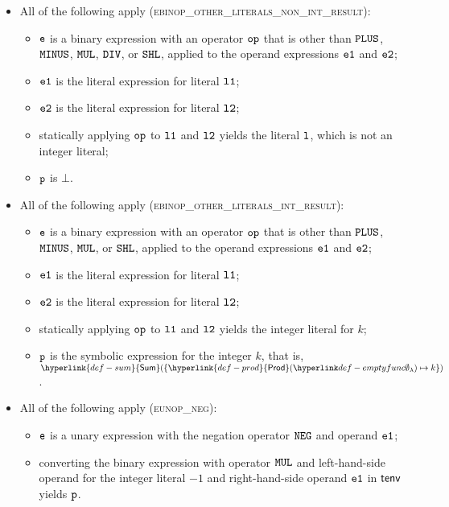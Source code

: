 \documentclass{book}
\newcommand\Prod[0]{\hyperlink{def-prod}{\textsf{Prod}}}
\newcommand\Sum[0]{\hyperlink{def-sum}{\textsf{Sum}}}
\begin{document}
\begin{itemize}
  \item All of the following apply (\textsc{ebinop\_other\_literals\_non\_int\_result}):
  \begin{itemize}
    \item $\texttt{e}$ is a binary expression with an operator $\texttt{op}$ that is other than $\texttt{PLUS}$, $\texttt{MINUS}$, $\texttt{MUL}$, $\texttt{DIV}$, or $\texttt{SHL}$,
          applied to the operand expressions $\texttt{e1}$ and $\texttt{e2}$;
    \item $\texttt{e1}$ is the literal expression for literal $\texttt{l1}$;
    \item $\texttt{e2}$ is the literal expression for literal $\texttt{l2}$;
    \item statically applying $\texttt{op}$ to $\texttt{l1}$ and $\texttt{l2}$ yields the literal $\texttt{l}$, which is not an integer literal;
    \item $\texttt{p}$ is $\bot$.
  \end{itemize}

  \item All of the following apply (\textsc{ebinop\_other\_literals\_int\_result}):
  \begin{itemize}
    \item $\texttt{e}$ is a binary expression with an operator $\texttt{op}$ that is other than $\texttt{PLUS}$, $\texttt{MINUS}$, $\texttt{MUL}$, or $\texttt{SHL}$,
          applied to the operand expressions $\texttt{e1}$ and $\texttt{e2}$;
    \item $\texttt{e1}$ is the literal expression for literal $\texttt{l1}$;
    \item $\texttt{e2}$ is the literal expression for literal $\texttt{l2}$;
    \item statically applying $\texttt{op}$ to $\texttt{l1}$ and $\texttt{l2}$ yields the integer literal for $k$;
    \item $\texttt{p}$ is the symbolic expression for the integer $k$, that is, $\Sum( \{ \Prod(\emptyfunc)\mapsto k \} )$.
  \end{itemize}

  \item All of the following apply (\textsc{eunop\_neg}):
  \begin{itemize}
    \item $\texttt{e}$ is a unary expression with the negation operator $\texttt{NEG}$ and operand $\texttt{e1}$;
    \item converting the binary expression with operator $\texttt{MUL}$ and left-hand-side operand for the integer literal $-1$ and
    right-hand-side operand $\texttt{e1}$ in $\textsf{tenv}$ yields $\texttt{p}$\ProseOrTypeErrorOrBot.
  \end{itemize}


\end{itemize}
\end{document}
